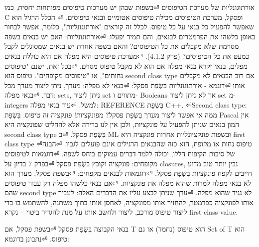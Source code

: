 \begin{טבלא}[!htbp]
      אורתוגונליות של מערכת הטיפוסים
⏎בשפות שבהן יש
      מערכות טיפוסים
      מפותחות יחסית, כמו
      C ופסקל, מערכת
      הטיפוסים מכילה
      טיפוסים אטומיים
      ובנאי טיפוסים.
⏎
      הכלל הרגיל הוא
      שאפשר להפעיל כל
      בנאי על כל טיפוס.
      לכלל זה קוראים
      "אורתוגונליות",
      כלומר, אפשר לבחור
      באופן כלשהו את
      הפרמטרים לבנאים,
      והם תמיד יפעלו.
⏎אורתוגונליות: האם יש בנאים בשפה מסוימת שלא מקבלים את כל הטיפוסים? והאם בשפה אחרת יש בנאים שמסוגלים לקבל כמעט את כל הטיפוסים? (פרק 4.1.2).
⏎מערכת טיפוסים היא מפלה אם היא כוללת בנאים מפלים, בנאי יקרא בנאי מפלה אם הוא לא מקבל טיפוס מסוים.
⏎בכל זאת, ישנם "טיפוסים נחותים", או "טיפוסים מקופחים". טיפוס הוא second class type אם רוב הבנאים לא מקבלים אותו
⏎דוגמא - אורתוגונליות בִּשְׂפַת פסקל:
⏎בנאי לא מפלה: מערך, ניתן ליצור מערך מכל דבר.
⏎בנאי מפלה: sets, ניתן ליצור set מתווים ו- Booleans אך לא ניתן ליצור set מ- integers למשל.
⏎עוד בנאי מפלה: REFERENCE בִּשְׂפַת C++.
⏎Second class type: ממה אי אפשר ליצור מערך בִּשְׂפַת פסקל? מפונקציות! פונקציה זה טיפוס. בִּשְׂפַת Pascal אין המון בנאים שניתן להפעיל על פונקציות, ולכן אין לנו ברירה אלא להחליט שפונקציה היא second class type בִּשְׂפַת פסקל.
⏎ב ML ובשפות פונקציונליות אחרות פונקציה היא first class type
⏎טיפוס נחות או מקופח, הוא כזה שהבנאים הרגילים אינם פועלים לגביו.
⏎הבנה של סיבות הקיפוח הללו, יכולה ללמד דברים עמוקים ביחס לשפה.
⏎דוגמאות לטיפוסים מקופחים: פונקציה וקובץ בִּשְׂפַת פסקל
⏎בפרק 7 בדיון על closures, נבין יותר טוב מדוע חייבים לקפח פונקציות בִּשְׂפַת פסקל.
⏎דוגמאות לבנאים מקפחים:
⏎בשפת פסקל, מערך הוא לא בנאי מפלה למרות שהוא מפלה את פונקציות.
⏎אם בנאי כלשהו מפלה רק עבור טיפוסים שהם second type לא נגיד שהוא מפלה.
⏎ערך שניתן לבצע עליו את הדברים האלה: לעביר אותו לפונקציה כפרמטר, להחזיר אותו מפונקציה, לאחסן אותו בתוך משתנה, להשתמש בו כדי ליצור טיפוס מורכב, ליצור ולחשב אותו על מנת להגדיר ביטוי – נקרא first class value.

      בנאי הקבוצה בִּשְׂפַת פסקל
⏎בשפת פסקל, אם T הוא טיפוס (נחמד) אז גם Set of T הוא טיפוס.
⏎נתבונן בדוגמא:


\end{טבלא}
